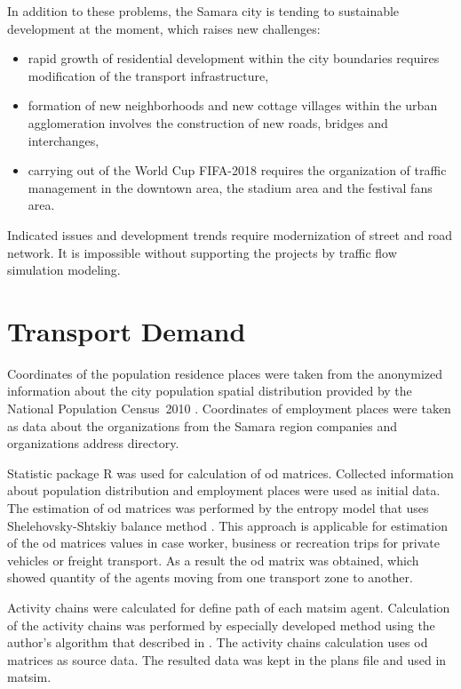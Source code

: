 In addition to these problems, the Samara city is tending to sustainable development at the moment, which raises new challenges:
\begin{itemize}
\item rapid growth of residential development within the city boundaries requires modification of the transport infrastructure,
\item formation of new neighborhoods and new cottage villages within the urban agglomeration involves the construction of new roads, bridges and interchanges,
\item carrying out of the World Cup FIFA-2018 requires the organization of traffic management in the downtown area, the stadium area and the festival fans area.
\end{itemize}

Indicated issues and development trends require modernization of street and road network. It is impossible without supporting the projects by traffic flow simulation modeling.

\section{Transport Demand}
Coordinates of the population residence places were taken from the anonymized information about the city population spatial distribution provided by the National Population Census~2010 \citep[][]{GKS_2010}. Coordinates of employment places were taken as data about the organizations from the Samara region companies and organizations address directory.

Statistic package R was used for calculation of \gls{od} matrices. Collected information about population distribution and employment places were used as initial data. The estimation of \gls{od} matrices was performed by the entropy model that uses Shelehovsky-Shtskiy balance method \citep[][]{Nurminski_2009, Autodor_2013, Shvetsov_2003}. This approach is applicable for estimation of the \gls{od} matrices values in case worker, business or recreation trips for private vehicles or freight transport. As a result the \gls{od} matrix was obtained, which showed quantity of the agents moving from one transport zone to another.

Activity chains were calculated for define path of each \gls{matsim} agent. Calculation of the activity chains was performed by especially developed method using the author's algorithm that described in \citet[][]{SaprykinaEtAl_2012}. The activity chains calculation uses \gls{od} matrices as source data. The resulted data was kept in the plans file and used in \gls{matsim}.

